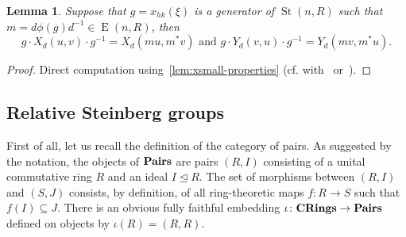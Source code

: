 \documentclass[oneside, 10pt]{amsart}
\DeclareMathOperator{\St}{St}
\DeclareMathOperator{\E}{E}
\newcommand{\catname}[1]{{\normalfont\textbf{#1}}}
\numberwithin{equation}{section}
\newtheorem{lemma}{Lemma}
\numberwithin{lemma}{section}
\theoremstyle{definition}
\theoremstyle{remark}
\begin{document}
\begin{lemma} \label{lem:xy-conj} Suppose that $g = x_{hk}(\xi)$ is a generator of $\St(n, R)$ such that $m = d\phi(g)d^{-1} \in \E(n, R)$, then 
 \begin{equation*} g \cdot X_d(u, v) \cdot g^{-1} = X_d(mu, m^*v) \text{ and } g \cdot Y_d(v, u) \cdot g^{-1} = Y_d(mv, m^*u). \end{equation*}
\end{lemma}
\begin{proof}
Direct computation using~\cref{lem:xsmall-properties} (cf. with~\cite[3.14]{Ka77} or~\cite[Lemma~4.4d]{LS17}).
\begin{comment} %
 Choose $w\in R^n$ such that $w^t u = 1$ and write $v = \sum_{1\leq i<j\leq n} u_{ij} c_{ij}$, where $u_{ij}$ and $c_{ij} = c_{ij}(v, w)$ are as in~\eqref{eq:canonical}. 
 By~\cref{lem:xsmall-properties} we can write $g \cdot X_d(u, v) \cdot g^{-1}$ as follows:
 \begin{equation} \nonumber
   \prod\limits_{1\leq i<j\leq n} x(\phi(g) \cdot d^{-1} \cdot u, \phi(g)^* \cdot d \cdot u_{ij}c_{ij})
 = \prod\limits_{1\leq i<j\leq n} x( d^{-1} \cdot m \cdot u, d \cdot m^* \cdot u_{ij}c_{ij}).
 \end{equation} 
 Now for every factor in the right-hand side we do the following:
 if $\{i, j\} = \{h, k\}$ or $\{i, j\} \cap \{h, k\} = \emptyset$ we leave the factor unchanged,
 otherwise, if, $|\{i, j\} \cap \{h, k\}| = 1$,  say $j = h$, $i\neq k$, we further decompose it as follows:
  \begin{equation} \nonumber
     x(d^{-1} \cdot u', d \cdot m^* \cdot u_{ij} c_{ij}) = 
     x(d^{-1} \cdot u', d \cdot u'_{ij} c_{ij}) \cdot 
     x(d^{-1} \cdot u', d \cdot u'_{ki} c_{ij}).
  \end{equation}
  Here $u' = m  u = t_{jk}(\xi') \cdot u$ for some $\xi' \in R$.
  Notice that $m^* \cdot u_{ij} = t_{kj}(-\xi') \cdot u_{ij} = e_iu_j - e_ju_i + e_k\xi'u_i =u'_{ij}+u'_{ki}\xi'$. 
  
  Thus, we have written the expression in the form $\prod_{s} x(d^{-1} \cdot u', d \cdot v'_s) $, where $v'_s \in D(u')$ and
   $\sum v'_s = m^*v$. It is clear now, that the latter expression equals $X_d(m u, m^* v)$.
\end{comment} 
\end{proof}

\subsection{Relative Steinberg groups} \label{sec:relative-steinberg}
First of all, let us recall the definition of the category of pairs. 
As suggested by the notation, the objects of $\catname{Pairs}$ are pairs $(R, I)$ consisting of a unital commutative ring $R$ and an ideal $I \trianglelefteq R$.
The set of morphisms between $(R, I)$ and $(S, J)$ consists, by definition, of all ring-theoretic maps $f\colon R\to S$ such that $f(I)\subseteq J$.
There is an obvious fully faithful embedding $\iota\colon \catname{CRings} \to \catname{Pairs}$ defined on objects by $\iota(R) = (R, R)$.
\end{document}
